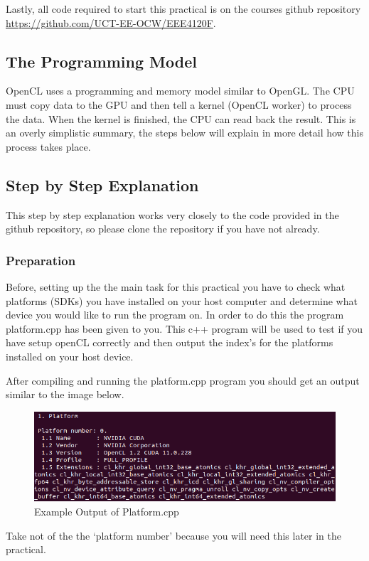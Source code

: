 Lastly, all code required to start this practical is on the courses github repository \href{https://github.com/UCT-EE-OCW/EEE4120F}{https://github.com/UCT-EE-OCW/EEE4120F}.

\subsection{The Programming Model}
OpenCL uses a programming and memory model similar to OpenGL. The CPU must copy data to the GPU and then tell a kernel (OpenCL worker) to process the data. When the kernel is finished, the CPU can read back the result. This is an overly simplistic summary, the steps below will explain in more detail how this process takes place.


\subsection{Step by Step Explanation}
This step by step explanation works very closely to the code provided in the github repository, so please clone the repository if you have not already.

\subsubsection{Preparation}
Before, setting up the the main task for this practical you have to check what platforms (SDKs) you have installed on your host computer and determine what device you would like to run the program on. In order to do this the program platform.cpp has been given to you. This c++ program will be used to test if you have setup openCL correctly and then output the index's for the platforms installed on your host device.

After compiling and running the platform.cpp program you should get an output similar to the image below.

\begin{figure}[H]
\centering
\includegraphics[width=0.6\columnwidth]{Figures/platformOutput.png}
\caption{Example Output of Platform.cpp}
\label{fig:platform}
\end{figure}

Take not of the the `platform number' because you will need this later in the practical.

